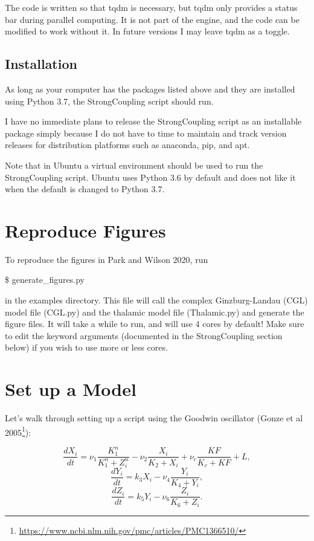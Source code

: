 \documentclass[english,a4paper,oneside]{article}
\renewcommand{\href}[2]{#2\footnote{\url{#1}}}
\begin{document}
The code is written so that tqdm is necessary, but tqdm only provides a
status bar during parallel computing. It is not part of the engine, and
the code can be modified to work without it. In future versions I may
leave tqdm as a toggle.

\subsection{Installation}\label{installation}

As long as your computer has the packages listed above and they are
installed using Python 3.7, the StrongCoupling script should run.

I have no immediate plans to release the StrongCoupling script as an
installable package simply because I do not have to time to maintain and
track version releases for distribution platforms such as anaconda, pip,
and apt.

Note that in Ubuntu a virtual environment should be used to run the
StrongCoupling script. Ubuntu uses Python 3.6 by default and does not
like it when the default is changed to Python 3.7.

\section{Reproduce Figures}\label{reproduce-figures}

To reproduce the figures in Park and Wilson 2020, run

\$ generate\_figures.py

in the examples directory. This file will call the complex
Ginzburg-Landau (CGL) model file (CGL.py) and the thalamic model file
(Thalamic.py) and generate the figure files. It will take a while to
run, and will use 4 cores by default! Make sure to edit the keyword
arguments (documented in the StrongCoupling section below) if you wish
to use more or less cores.

\section{Set up a Model}\label{set-up-a-model}

Let's walk through setting up a script using the Goodwin oscillator
(\href{https://www.ncbi.nlm.nih.gov/pmc/articles/PMC1366510/}{Gonze et
al 2005}):

\[\frac{dX_i}{dt} = \nu_1 \frac{K_1^n}{K_1^n+Z_i^n} - \nu_2 \frac{X_i}{K_2 + X_i}+ \nu_c \frac{KF}{K_c + KF} + L,\]
\[\frac{dY_i}{dt} = k_3 X_i - \nu_4 \frac{Y_i}{K_4 + Y_i},\]
\[\frac{dZ_i}{dt} = k_5 Y_i - \nu_6 \frac{Z_i}{K_6 + Z_i}.\]
\end{document}
